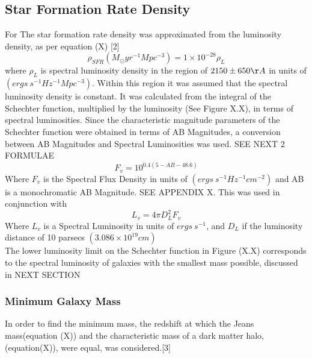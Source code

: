 \documentclass[pdf,color]{UoBnote}
\begin{document}

\subsection{Star Formation Rate Density}
For The star formation rate density was approximated from the luminosity density, as per equation (X) [2]
\begin{equation}
\rho_{SFR}(M_\odot yr^{-1} Mpc^{-3})=1\times 10^{-28} \rho_L 
\end{equation}
where $\rho_L$ is spectral luminosity density in the region of $2150\pm 650 \AA$ in units of $(ergs \ s^{-1} Hz^{-1} Mpc^{-3})$. Within this region it was assumed that the spectral luminosity density is constant. It was calculated from the integral of the Schechter function, multiplied by the luminosity (See Figure X.X), in terms of spectral luminosities. Since the characteristic magnitude parameters of the Schechter function were obtained in terms of AB Magnitudes, a conversion between AB Magnitudes and Spectral Luminosities was used. SEE NEXT 2 FORMULAE
\begin{equation}
F_v = 10^{0.4(5-AB-48.6)} 
\end{equation}
Where $F_v$ is the Spectral Flux Density in units of $(ergs \ s^{-1} Hz^{-1} cm^{-2})$ and AB is a monochromatic AB Magnitude. SEE APPENDIX X. This was used in conjunction with
\begin{equation}
L_v=4\pi D_L^2 F_v
\end{equation} 
Where $L_v$ is a Spectral Luminosity in units of $ergs \ s^{-1}$, and $D_L$ if the luminosity distance of 10 parsecs $(3.086\times10^19 cm)$ \\
\newline
The lower luminosity limit on the Schechter function in Figure (X.X) corresponds to the spectral luminosity of galaxies with the smallest mass possible, discussed in NEXT SECTION
\subsubsection{Minimum Galaxy Mass}
In order to find the minimum mass, the redshift at which the Jeans mass(equation (X)) and the characteristic mass of a dark matter halo, (equation(X)), were equal, was considered.[3]
\end{document}
